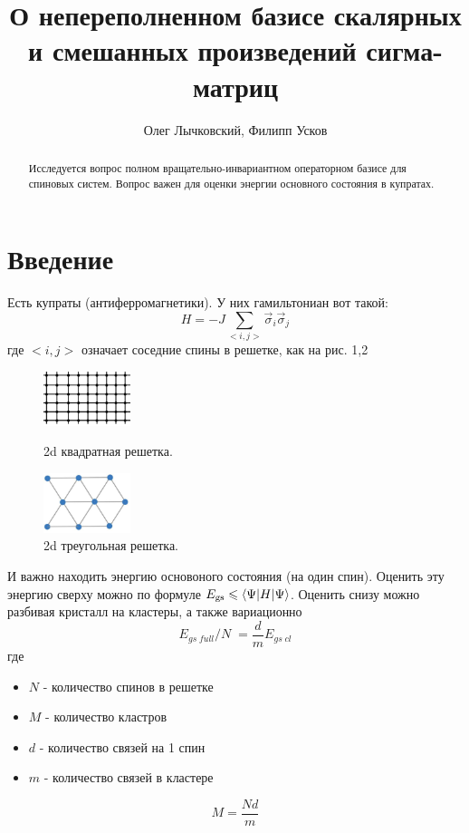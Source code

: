 \documentclass[]{article}
\title{О непереполненном базисе скалярных и смешанных произведений сигма-матриц}
\author{Олег Лычковский, Филипп Усков}
\begin{document}
\maketitle

\begin{abstract}
Исследуется вопрос полном вращательно-инвариантном операторном базисе для спиновых систем.  Вопрос важен для оценки энергии основного состояния в купратах.

\end{abstract}

\section{Введение}

Есть купраты (антиферромагнетики). У них гамильтониан вот такой:
$$H=-J\sum_{<i,j>}\vec\sigma_i\vec\sigma_j$$
где $<i,j>$ означает соседние спины в решетке, как на рис. 1,2
\begin{figure}[h]
	\begin{minipage}{6pc}
		\includegraphics[width=6pc]{sqlattice.png}
	\end{minipage}\hspace{2pc}%
	\begin{minipage}{5pc}
		\caption{\label{label} 2d квадратная решетка.}
	\end{minipage}\hspace{2pc}%
	\begin{minipage}{6pc}
		\includegraphics[width=6pc]{triangle-lattice.png}
	\end{minipage}\hspace{2pc}%
	\begin{minipage}{5pc}
		\caption{\label{label} 2d треугольная решетка.}
	\end{minipage} 
\end{figure}

И важно находить энергию основоного состояния (на один спин).
Оценить эту энергию сверху можно по формуле $E_{\rm gs} \leqslant \langle \Psi|H| \Psi \rangle$.
Оценить снизу можно разбивая кристалл на кластеры\cite{Anderson}, а также вариационно \cite{variational} 
$${E_{gs\;full}}/N\;=\frac{d}{m}{E_{gs\;cl}}$$
где
\begin{itemize}
	\item $N$ - количество спинов в решетке
	\item $M$ - количество кластров
	\item $d$ - количество связей на 1 спин
	\item $m$ - количество связей в кластере
\end{itemize}
$$M = \frac{{Nd}}{m} \label{MNdm} $$
\end{document}
